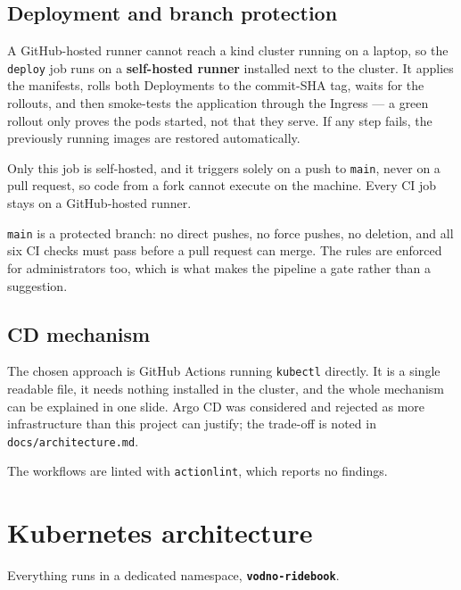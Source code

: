 \documentclass[10pt,a4paper]{article}
\newcommand{\cd}[1]{\texttt{\small #1}}
\begin{document}
\subsection{Deployment and branch protection}

A GitHub-hosted runner cannot reach a kind cluster running on a laptop, so
the \cd{deploy} job runs on a \textbf{self-hosted runner} installed next to
the cluster. It applies the manifests, rolls both Deployments to the
commit-SHA tag, waits for the rollouts, and then smoke-tests the application
through the Ingress --- a green rollout only proves the pods started, not
that they serve. If any step fails, the previously running images are
restored automatically.

Only this job is self-hosted, and it triggers solely on a push to \cd{main},
never on a pull request, so code from a fork cannot execute on the machine.
Every CI job stays on a GitHub-hosted runner.

\cd{main} is a protected branch: no direct pushes, no force pushes, no
deletion, and all six CI checks must pass before a pull request can merge.
The rules are enforced for administrators too, which is what makes the
pipeline a gate rather than a suggestion.

\subsection{CD mechanism}

The chosen approach is GitHub Actions running \cd{kubectl} directly. It is a
single readable file, it needs nothing installed in the cluster, and the whole
mechanism can be explained in one slide. Argo CD was considered and rejected
as more infrastructure than this project can justify; the trade-off is noted
in \cd{docs/architecture.md}.

The workflows are linted with \cd{actionlint}, which reports no findings.

\section{Kubernetes architecture}

Everything runs in a dedicated namespace, \textbf{\cd{vodno-ridebook}}.
\end{document}
